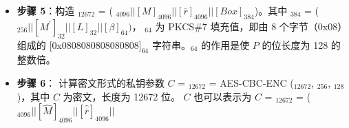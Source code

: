 \documentclass[main\_\_CN.tex]{subfiles}
\begin{document}
\begin{itemize}
    \item {\bfseries 步骤 5}：构造 \begin{math}[P]_{12672}\end{math} = (
            \begin{math}
                [Y]_{4096} ||
                [M]_{4096} ||
                [\overline{r}]_{4096} ||
                [Box]_{384}
            \end{math})。其中
            \begin{math}[Box]_{384}\end{math} = (
            \begin{math}
                [MD]_{256} ||
                [M^{\prime}]_{32} ||
                [L]_{32} ||
                [\beta]_{64})
            \end{math}，
            \begin{math}[\beta]_{64} \end{math} 为 PKCS\#7 填充值，即由 8 个字节（0x08）组成的 $[$0x0808080808080808$]_{64}$ 字符串。\begin{math}[\beta]_{64}\end{math} 的作用是使 \begin{math}P\end{math} 的位长度为 128 的整数倍。
    \item {\bfseries 步骤 6}：
            计算密文形式的私钥参数 \begin{math}C\end{math} = \begin{math}[C]_{12672}\end{math} =
            AES-CBC-ENC (\begin{math}[P]_{12672}\end{math}, \begin{math}[RSA\_DS\_KEY]_{256}\end{math}, \begin{math}[IV]_{128}\end{math})，其中 $C$ 为密文，长度为 12672 位。
            \begin{math}C\end{math} 也可以表示为
            \begin{math}C\end{math} = \begin{math}[C]_{12672}\end{math} =
            (\begin{math}
            [\widehat{Y}]_{4096} ||
            [\widehat{M}]_{4096} ||
            [\widehat{ \overline{r} }]_{4096} ||

\end{math}
\end{itemize}
\end{document}
